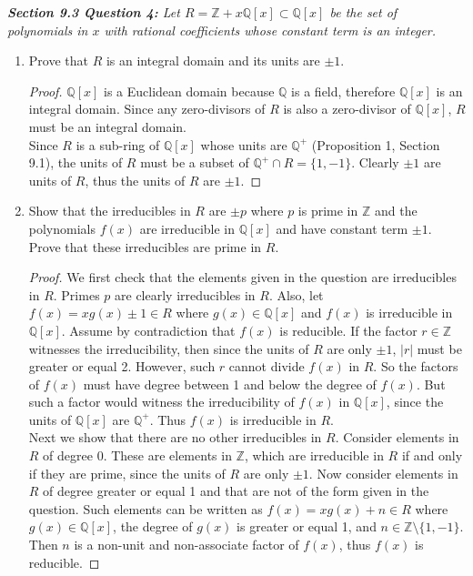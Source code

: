 \documentclass{article}
\begin{document}
\it \textbf{Section 9.3 Question 4:} Let
  $R=\mathbb{Z}+x\mathbb{Q}[x]\subset\mathbb{Q}[x]$ be the set of
  polynomials in $x$ with rational coefficients whose constant term is an
  integer.

  \begin{enumerate}[label={(\alph*)}]
    \item Prove that $R$ is an integral domain and its units are $\pm1$.
      \begin{proof}
        $\mathbb{Q}[x]$ is a Euclidean domain because $\mathbb{Q}$ is a
        field, therefore $\mathbb{Q}[x]$ is an integral domain. Since any
        zero-divisors of $R$ is also a zero-divisor of $\mathbb{Q}[x]$, $R$
        must be an integral domain. \\

        Since $R$ is a sub-ring of $\mathbb{Q}[x]$ whose units are
        $\mathbb{Q}^+$ (Proposition 1, Section 9.1), the units of $R$ must
        be a subset of $\mathbb{Q}^+\cap R=\{1,-1\}$. Clearly $\pm1$ are
        units of $R$, thus the units of $R$ are $\pm1$.
      \end{proof}

    \item Show that the irreducibles in $R$ are $\pm p$ where $p$ is prime
      in $\mathbb{Z}$ and the polynomials $f(x)$ are irreducible in
      $\mathbb{Q}[x]$ and have constant term $\pm1$. Prove that these
      irreducibles are prime in $R$.
      \begin{proof}
        We first check that the elements given in the question are
        irreducibles in $R$. Primes $p$ are clearly irreducibles in $R$.
        Also, let $f(x)=xg(x)\pm1\in R$ where $g(x)\in\mathbb{Q}[x]$ and
        $f(x)$ is irreducible in $\mathbb{Q}[x]$. Assume by contradiction
        that $f(x)$ is reducible. If the factor $r\in\mathbb{Z}$ witnesses
        the irreducibility, then since the units of $R$ are only $\pm1$,
        $|r|$ must be greater or equal 2. However, such $r$ cannot divide
        $f(x)$ in $R$. So the factors of $f(x)$ must have degree between 1
        and below the degree of $f(x)$. But such a factor would witness the
        irreducibility of $f(x)$ in $\mathbb{Q}[x]$, since the units of
        $\mathbb{Q}[x]$ are $\mathbb{Q}^+$. Thus $f(x)$ is irreducible in
        $R$. \\

        Next we show that there are no other irreducibles in $R$. Consider
        elements in $R$ of degree 0. These are elements in $\mathbb{Z}$,
        which are irreducible in $R$ if and only if they are prime, since
        the units of $R$ are only $\pm1$. Now consider elements in $R$ of
        degree greater or equal 1 and that are not of the form given in the
        question. Such elements can be written as $f(x)=xg(x)+n\in R$ where
        $g(x)\in\mathbb{Q}[x]$, the degree of $g(x)$ is greater or equal 1,
        and $n\in\mathbb{Z}\setminus\{1,-1\}$. Then $n$ is a non-unit and
        non-associate factor of $f(x)$, thus $f(x)$ is reducible.
      \end{proof}


\end{enumerate}
\end{document}
